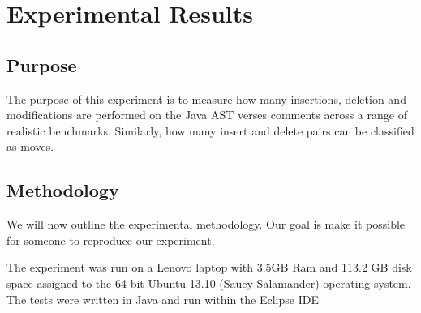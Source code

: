 
\chapter{Experimental Results}

\section{Purpose}
The purpose of this experiment is to measure how many insertions, deletion and modifications are performed on the Java AST verses comments across a range of realistic benchmarks. Similarly, how many insert and delete pairs can be classified as moves. 


\section{Methodology}
We will now outline the experimental methodology. Our goal is make it possible for someone to reproduce our experiment.

The experiment was run on a Lenovo laptop with 3.5GB Ram and 113.2 GB disk space assigned to the 64 bit Ubuntu 13.10 (Saucy Salamander) operating system. The tests were written in Java and run within the Eclipse IDE



